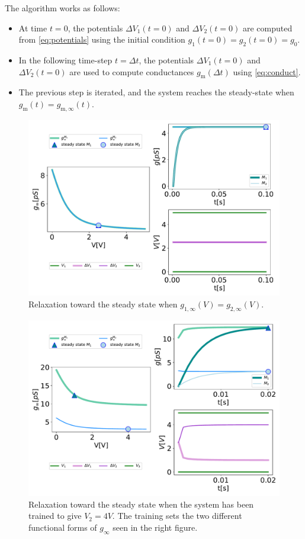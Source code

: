 \documentclass[10.5pt]{article}
\newcommand{\m}{\text{m}} %
\begin{document}
The algorithm works as follows:

\begin{itemize}

    \item At time $t=0$, the potentials $\Delta V_1(t=0)$ and $\Delta V_2(t=0)$ are computed from \cref{eq:potentials} using the initial condition $g_1(t=0)=g_2(t=0)=g_0$.
    \item In the following time-step $t=\Delta t$, the potentials $\Delta V_1(t=0)$ and $\Delta V_2(t=0)$ are used to compute conductances $g_{\m}(\Delta t)$ using \cref{eq:conduct}.
    \item The previous step is iterated, and the system reaches the steady-state when $g_{\m}(t)=g_{\m,\infty}(t)$.

\end{itemize}

\begin{figure}[h]
    \centering
    \includegraphics[width=0.8\columnwidth]{../plots/grid_initial_condition.pdf}
    \caption{Relaxation toward the steady
    state when $g_{1,\infty}(V)=g_{2,\infty}(V)$.}
    \label{fig:memristor_network}
\end{figure} 

\begin{figure}[h]
    \centering
    \includegraphics[width=0.8\columnwidth]{../plots/grid_trained.pdf}
    \caption{Relaxation toward the steady state when the system has been trained to give $V_2 = 4V$. The training sets the two different functional forms of $g_{\infty}$ seen in the right figure.}
    \label{fig:memristor_network}
\end{figure} 
\end{document}
